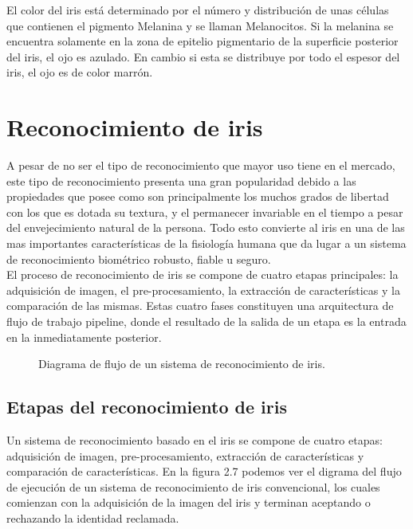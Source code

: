 El color del iris está determinado por el número y distribución de unas células que contienen el pigmento Melanina y se llaman Melanocitos. Si la melanina se encuentra solamente en la zona de epitelio pigmentario de la superficie posterior del iris, el ojo es azulado. En cambio si esta se distribuye por todo el espesor del iris, el ojo es de color marrón. \\




\section{Reconocimiento de iris}

A pesar de no ser el tipo de reconocimiento que mayor uso tiene en el mercado, este tipo de reconocimiento presenta una gran popularidad debido a las propiedades que posee como son principalmente los muchos grados de libertad con los que es dotada su textura, y el permanecer invariable en el tiempo a pesar del envejecimiento natural de la persona. Todo esto convierte al iris en una de las mas importantes características de la fisiología humana que da lugar a un sistema de reconocimiento biométrico robusto, fiable u seguro. \\

El proceso de reconocimiento de iris se compone de cuatro etapas principales: la adquisición de imagen, el pre-procesamiento, la  extracción de características y la comparación de las mismas. Estas cuatro fases constituyen una arquitectura de flujo de trabajo pipeline, donde el resultado de la salida de un etapa es la entrada en la inmediatamente posterior.\\

\begin{figure}[htbp]
\centering
{}
\caption{Diagrama de flujo de un sistema de reconocimiento de iris.} \label{fig:señales}
\end{figure}


\subsection{Etapas del reconocimiento de iris}

Un sistema de reconocimiento basado en el iris se compone de cuatro etapas: adquisición de imagen, pre-procesamiento, extracción de características y comparación de características. En la figura 2.7 podemos ver el digrama del flujo de ejecución de un sistema de reconocimiento de iris convencional, los cuales comienzan con la adquisición de la imagen del iris y terminan aceptando o rechazando la identidad reclamada. \\

